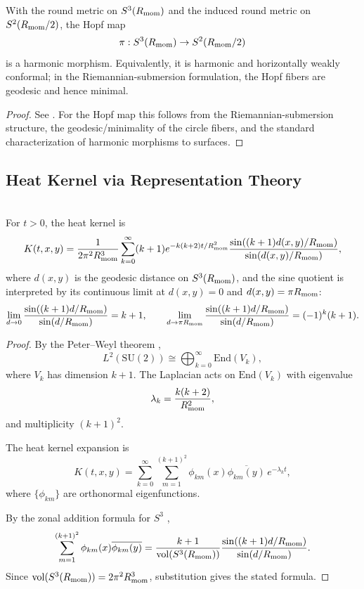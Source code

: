 \documentclass[11pt]{article}
\begin{document}
\begin{theorem}
\label{p1:thm:hopf-harmonic-morphism}
With the round metric on \(S^3(R_{\mathrm{mom}})\) and the induced round metric on
\(S^2(R_{\mathrm{mom}}/2)\), the Hopf map
\[
\pi:S^3(R_{\mathrm{mom}})\to S^2(R_{\mathrm{mom}}/2)
\]
is a harmonic morphism. Equivalently, it is harmonic and horizontally weakly
conformal; in the Riemannian-submersion formulation, the Hopf fibers are geodesic
and hence minimal.
\end{theorem}

\begin{proof}
See \cite{Fuglede1978,BairdWood2003}. For the Hopf map this follows from the
Riemannian-submersion structure, the geodesic/minimality of the circle fibers,
and the standard characterization of harmonic morphisms to surfaces.
\end{proof}


\subsection{Heat Kernel via Representation Theory}
\label{p1:subsec:heat-kernel-proof}

\begin{theorem}
\label{p1:thm:heat-kernel-s3}
\mbox{}\\[6pt]
For \(t>0\), the heat kernel is
\[
K(t,x,y)
=
\frac{1}{2\pi^2 R_{\mathrm{mom}}^3}
\sum_{k=0}^{\infty}
(k+1)e^{-k(k+2)t/R_{\mathrm{mom}}^2}
\frac{\sin((k+1)d(x,y)/R_{\mathrm{mom}})}{\sin(d(x,y)/R_{\mathrm{mom}})},
\]
where \(d(x,y)\) is the geodesic distance on \(S^3(R_{\mathrm{mom}})\), and the sine quotient
is interpreted by its continuous limit at \(d(x,y)=0\) and
\(d(x,y)=\pi R_{\mathrm{mom}}\):
\[
\lim_{d\to0}\frac{\sin((k+1)d/R_{\mathrm{mom}})}{\sin(d/R_{\mathrm{mom}})}=k+1,
\qquad
\lim_{d\to\pi R_{\mathrm{mom}}}\frac{\sin((k+1)d/R_{\mathrm{mom}})}{\sin(d/R_{\mathrm{mom}})}=(-1)^k(k+1).
\]
\end{theorem}

\begin{proof}
By the Peter--Weyl theorem \cite{Peter1927,helgason1984groups},
\[
L^2(\mathrm{SU}(2)) \cong \bigoplus_{k=0}^{\infty} \mathrm{End}(V_k),
\]
where \(V_k\) has dimension \(k+1\). The Laplacian acts on \(\mathrm{End}(V_k)\) with eigenvalue
\[
\lambda_k=\frac{k(k+2)}{R_{\mathrm{mom}}^2},
\]
and multiplicity \((k+1)^2\).

The heat kernel expansion is \cite{berline1992heat,Camporesi1991,minakshisundaram1949some}
\[
K(t,x,y)=\sum_{k=0}^{\infty}\sum_{m=1}^{(k+1)^2}\phi_{km}(x)\overline{\phi_{km}(y)}\,e^{-\lambda_k t},
\]
where \(\{\phi_{km}\}\) are orthonormal eigenfunctions.

By the zonal addition formula for \(S^3\) \cite{helgason1984groups,Camporesi1991},
\[
\sum_{m=1}^{(k+1)^2}\phi_{km}(x)\overline{\phi_{km}(y)}
=
\frac{k+1}{\operatorname{vol}(S^3(R_{\mathrm{mom}}))}
\frac{\sin((k+1)d/R_{\mathrm{mom}})}{\sin(d/R_{\mathrm{mom}})}.
\]
Since \(\operatorname{vol}(S^3(R_{\mathrm{mom}}))=2\pi^2R_{\mathrm{mom}}^3\), substitution gives the stated formula.
\end{proof}
\end{document}
